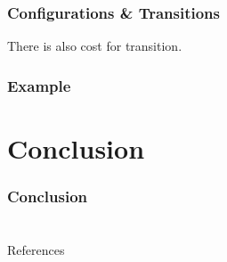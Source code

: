 \documentclass{beamer}
\begin{document}
\begin{frame}
  \frametitle{Configurations \& Transitions}
  \vspace*{\fill}
  There is also cost for transition.
\end{frame}

\begin{frame}
  \frametitle{Example}
\end{frame}


\section*{Conclusion}
\begin{frame}
  \frametitle{Conclusion}
\end{frame}


\appendix
\section*{}
\begin{frame}[allowframebreaks]{References}
  
  
\end{frame}
\end{document}
